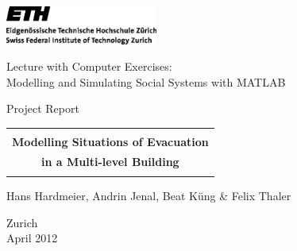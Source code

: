 
\thispagestyle{empty}

\begin{center}
\includegraphics[width=5cm]{ETHlogo.eps}

\bigskip


\bigskip


\bigskip


\LARGE{ 	Lecture with Computer Exercises:\\ }
\LARGE{ Modelling and Simulating Social Systems with MATLAB\\}

\bigskip

\bigskip

\small{Project Report}\\

\bigskip

\bigskip

\bigskip

\bigskip


\begin{tabular}{|c|}
\hline
\\
\textbf{\LARGE{Modelling Situations of Evacuation }}\\
\textbf{\LARGE{in a Multi-level Building}}\\
\\
\hline
\end{tabular}
\bigskip

\bigskip

\bigskip

\LARGE{Hans Hardmeier, Andrin Jenal, Beat K\"ung \& Felix Thaler}



\bigskip

\bigskip

\bigskip

\bigskip

\bigskip

\bigskip

\bigskip

\bigskip

Zurich\\
April 2012\\

\end{center}


